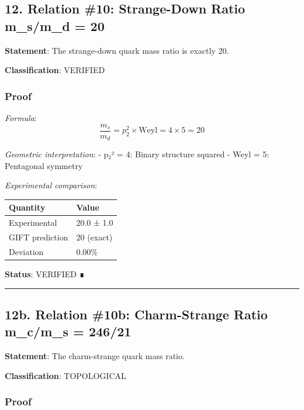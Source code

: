 \documentclass[11pt,a4paper]{article}
\begin{document}
\subsection{12. Relation \#10: Strange-Down Ratio m\_s/m\_d = 20}\label{relation-10-strange-down-ratio-m_sm_d-20}

\textbf{Statement}: The strange-down quark mass ratio is exactly 20.

\textbf{Classification}: VERIFIED

\subsubsection{Proof}\label{proof-8}

\emph{Formula}:
\[\frac{m_s}{m_d} = p_2^2 \times \text{Weyl} = 4 \times 5 = 20\]

\emph{Geometric interpretation}:
- p₂² = 4: Binary structure squared
- Weyl = 5: Pentagonal symmetry

\emph{Experimental comparison}:

{\def\LTcaptype{none} %
\begin{longtable}[]{@{}ll@{}}
\toprule\noalign{}
Quantity & Value \\
\midrule\noalign{}
\endhead
\bottomrule\noalign{}
\endlastfoot
Experimental & 20.0 ± 1.0 \\
GIFT prediction & 20 (exact) \\
Deviation & 0.00\% \\
\end{longtable}
}

\textbf{Status}: VERIFIED ∎

\begin{center}\rule{0.5\linewidth}{0.5pt}\end{center}

\subsection{12b. Relation \#10b: Charm-Strange Ratio m\_c/m\_s = 246/21}\label{b.-relation-10b-charm-strange-ratio-m_cm_s-24621}

\textbf{Statement}: The charm-strange quark mass ratio.

\textbf{Classification}: TOPOLOGICAL

\subsubsection{Proof}\label{proof-9}
\end{document}
